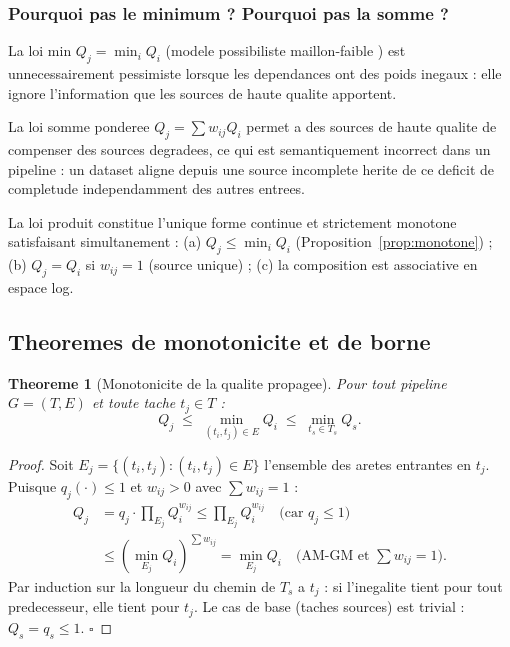 \documentclass[12pt,a4paper]{article}
\theoremstyle{plain}
\newtheorem{theorem}{Theoreme}[section]
\theoremstyle{definition}
\theoremstyle{remark}
\begin{document}
\subsubsection{Pourquoi pas le minimum ? Pourquoi pas la somme ?}

La loi min $Q_j = \min_i Q_i$ (modele possibiliste maillon-faible
\cite{possibility_theory}) est unnecessairement pessimiste lorsque les
dependances ont des poids inegaux : elle ignore l'information que
les sources de haute qualite apportent.

La loi somme ponderee $Q_j = \sum w_{ij} Q_i$ permet a des sources de
haute qualite de compenser des sources degradees, ce qui est
semantiquement incorrect dans un pipeline : un dataset aligne depuis
une source incomplete herite de ce deficit de completude
independamment des autres entrees.

La loi produit constitue l'unique forme continue et strictement
monotone satisfaisant simultanement :
(a) $Q_j \leq \min_i Q_i$ (Proposition~\ref{prop:monotone}) ;
(b) $Q_j = Q_i$ si $w_{ij}=1$ (source unique) ;
(c) la composition est associative en espace log.

\subsection{Theoremes de monotonicite et de borne}

\begin{theorem}[Monotonicite de la qualite propagee]
\label{thm:monotone}
Pour tout pipeline $G=(T,E)$ et toute tache $t_j \in T$ :
\begin{equation}
Q_j \;\leq\; \min_{(t_i,t_j)\in E} Q_i
      \;\leq\; \min_{t_s \in T_s} Q_s.
\label{eq:monotone}
\end{equation}
\end{theorem}

\begin{proof}
Soit $E_j = \{(t_i,t_j) : (t_i,t_j)\in E\}$ l'ensemble des aretes
entrantes en $t_j$.
Puisque $q_j(\cdot) \leq 1$ et $w_{ij} > 0$ avec $\sum w_{ij}=1$ :
\begin{align*}
Q_j &= q_j \cdot \prod_{E_j} Q_i^{w_{ij}}
       \leq \prod_{E_j} Q_i^{w_{ij}}
       \quad\text{(car } q_j \leq 1\text{)}\\
    &\leq \left(\min_{E_j} Q_i\right)^{\sum w_{ij}}
       = \min_{E_j} Q_i
       \quad\text{(AM-GM et }\textstyle\sum w_{ij}=1\text{)}.
\end{align*}
Par induction sur la longueur du chemin de $T_s$ a $t_j$ :
si l'inegalite tient pour tout predecesseur, elle tient pour $t_j$.
Le cas de base (taches sources) est trivial : $Q_s = q_s \leq 1$.
\hfill$\square$
\end{proof}
\end{document}
